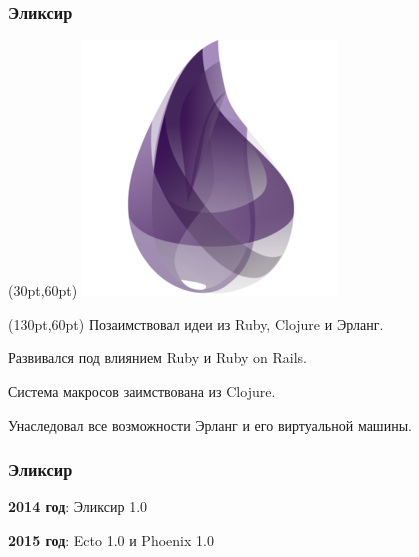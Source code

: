 \documentclass[10pt]{beamer}
\begin{document}
\begin{frame}
  \frametitle{Эликсир}
  \begin{textblock*}{75pt}(30pt,60pt)
    \includegraphics[scale=2.9]{elixir_logo}
  \end{textblock*}
  \begin{textblock*}{220pt}(130pt,60pt)
    Позаимствовал идеи из Ruby, Clojure и Эрланг.
    \par \bigskip
    Развивался под влиянием Ruby и Ruby on Rails.
    \par \bigskip
    Система макросов заимствована из Clojure.
    \par \bigskip
    Унаследовал все возможности Эрланг и его виртуальной машины.
  \end{textblock*}
\end{frame}

\begin{frame}
  \frametitle{Эликсир}
  \textbf{2014 год}: Эликсир 1.0
  \par \bigskip
  \textbf{2015 год}: Ecto 1.0 и Phoenix 1.0
\end{frame}
\end{document}
